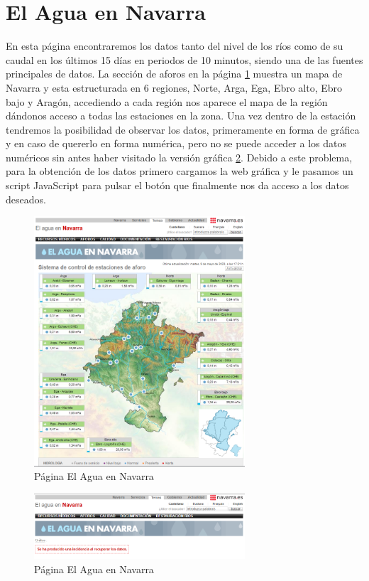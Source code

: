 \section{El Agua en Navarra}
En esta página encontraremos los datos tanto del nivel de los ríos como de su caudal en los últimos 15 días en periodos de 10 minutos, siendo una de las fuentes principales de datos.
\newline
\newline
La sección de aforos en la página \ref{fig:ej4} muestra un mapa de Navarra y esta estructurada en 6 regiones, Norte, Arga, Ega, Ebro alto, Ebro bajo y Aragón, accediendo a cada región nos aparece el mapa de la región dándonos acceso a todas las estaciones en la zona.
\newline
\newline
Una vez dentro de la estación tendremos la posibilidad de observar los datos, primeramente en forma de gráfica y en caso de quererlo en forma numérica, pero no se puede acceder a los datos numéricos sin antes haber visitado la versión gráfica \ref{fig:ej5}.
\newline
\newline
Debido a este problema, para la obtención de los datos primero cargamos la web gráfica y le pasamos un script JavaScript para pulsar el botón que finalmente nos da acceso a los datos deseados.

\begin{figure} [h!]
	\centering
	\includegraphics[width=0.7\textwidth]{fig/AguaEnNavarra.png}
	\caption[Página principal de aforos de El Agua en Navarra]{Página El Agua en Navarra}
	\label{fig:ej4}
\end{figure}

\begin{figure} [h!]
	\centering
	\includegraphics[width=0.7\textwidth]{fig/ErrorAguaEnNavarra.png}
	\caption[Página principal de aforos de El Agua en Navarra]{Página El Agua en Navarra}
	\label{fig:ej5}
\end{figure}